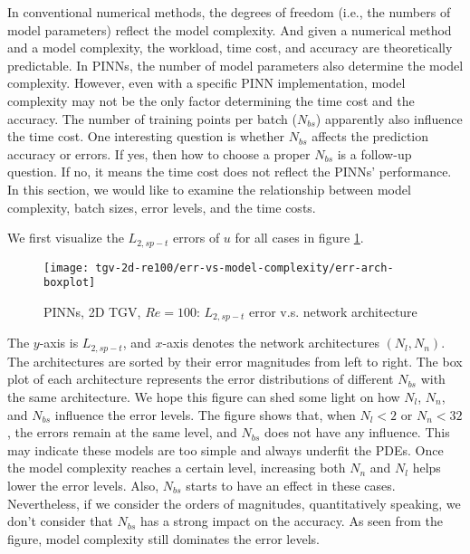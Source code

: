 
In conventional numerical methods, the degrees of freedom (i.e., the numbers of model parameters) reflect the model complexity.
And given a numerical method and a model complexity, the workload, time cost, and accuracy are theoretically predictable.
In PINNs, the number of model parameters also determine the model complexity.
However, even with a specific PINN implementation, model complexity may not be the only factor determining the time cost and the accuracy.
The number of training points per batch ($N_{bs}$) apparently also influence the time cost.
One interesting question is whether $N_{bs}$ affects the prediction accuracy or errors.
If yes, then how to choose a proper $N_{bs}$ is a follow-up question. 
If no, it means the time cost does not reflect the PINNs' performance.
In this section, we would like to examine the relationship between model complexity, batch sizes, error levels, and the time costs.

We first visualize the $L_{2,sp-t}$ errors of $u$ for all cases in figure \ref{fig:tgv2d-re100-err-vs-arch}.
\begin{figure}[hbt!]
    \centering%
    \texttt{[image: tgv-2d-re100/err-vs-model-complexity/err-arch-boxplot]}
    \caption[%
        PINNs, 2D TGV, $Re=100$: $L_{2,sp-t}$ error v.s. network architecture%
    ]{%
        PINNs, 2D TGV, $Re=100$: $L_{2,sp-t}$ error v.s. network architecture%
    }
    \label{fig:tgv2d-re100-err-vs-arch}
\end{figure}
The $y$-axis is $L_{2,sp-t}$, and $x$-axis denotes the network architectures $(N_l, N_n)$.
The architectures are sorted by their error magnitudes from left to right.
The box plot of each architecture represents the error distributions of different $N_{bs}$ with the same architecture.
We hope this figure can shed some light on how $N_l$, $N_n$, and $N_{bs}$ influence the error levels.
The figure shows that, when $N_l < 2$ or $N_n < 32$, the errors remain at the same level, and $N_{bs}$ does not have any influence.
This may indicate these models are too simple and always underfit the PDEs.
Once the model complexity reaches a certain level, increasing both $N_n$ and $N_l$ helps lower the error levels.
Also, $N_{bs}$ starts to have an effect in these cases.
Nevertheless, if we consider the orders of magnitudes, quantitatively speaking, we don't consider that $N_{bs}$ has a strong impact on the accuracy.
As seen from the figure, model complexity still dominates the error levels. 

